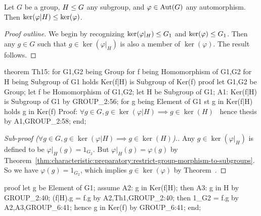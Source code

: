 \begin{theorem}
Let $G$ be a group, $H\leq G$ any subgroup, and $\varphi\in\operatorname{Aut}(G)$
any automorphism.
Then $\ker(\varphi|H)\leq\ker(\varphi)$.
\end{theorem}

\begin{proof}[Proof outline]
  We begin by recognizing $\ker(\varphi|_{H})\leq G_{1}$ and
  $\ker(\varphi)\leq G_{1}$. Then any $g\in G$ such that
  $g\in\ker(\varphi|_{H})$ is also a member of $\ker(\varphi)$. The
  result follows.
\end{proof}

\nwenddocs{}\endmoddef\nwstartdeflinemarkup{}\nwenddeflinemarkup
theorem Th15:
  for G1,G2 being Group
  for f being Homomorphism of G1,G2
  for H being Subgroup of G1
  holds Ker(f|H) is Subgroup of Ker(f)
proof
  let G1,G2 be Group;
  let f be Homomorphism of G1,G2;
  let H be Subgroup of G1;
  A1: Ker(f|H) is Subgroup of G1 by GROUP_2:56;
  for g being Element of G1 st g in Ker(f|H) holds g in Ker(f)
  \LA{}Proof: $\forall g\in G, g\in\ker(\varphi|H)\implies g\in\ker(H)$~{\nwtagstyle{}}\RA{}
  hence thesis by A1,GROUP_2:58;
end;
\eatline
{}\nwendcode{}\nwdocspar
\begin{proof}[Sub-proof ($\forall g\in G, g\in\ker(\varphi|H)\implies g\in\ker(H)$).]
Any $g\in\ker(\varphi|_{H})$ is defined to be $\varphi|_{H}(g)=1_{G_{2}}$.
But $\varphi|_{H}(g)=\varphi(g)$ by Theorem~\ref{thm:characteristic:preparatory:restrict-group-morphism-to-subgroups}. So we have
$\varphi(g)=1_{G_{2}}$, which implies $g\in\ker(\varphi)$ by Theorem~.
\end{proof}

\nwenddocs{}\endmoddef\nwstartdeflinemarkup{}\nwenddeflinemarkup
proof
  let g be Element of G1;
  assume A2: g in Ker(f|H);
  then A3: g in H by GROUP_2:40;
  (f|H).g = f.g by A2,Th1,GROUP_2:40;
  then 1_G2 = f.g by A2,A3,GROUP_6:41;
  hence g in Ker(f) by GROUP_6:41;
end;
\nwendcode{}\nwdocspar

